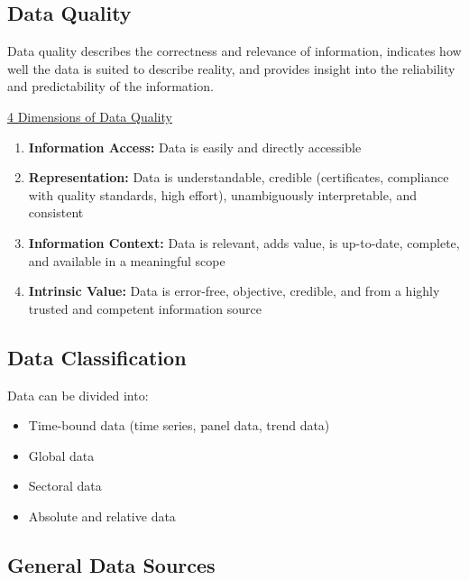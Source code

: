 \documentclass[a4paper, fleqn, headsepline, footsepline, 12pt, parskip=half]{scrartcl}
\begin{document}
\subsection{Data Quality}
\label{sec:dataQuality}

Data quality describes the correctness and relevance of information, indicates how well the data is suited to describe reality, and provides insight into the reliability and predictability of the information.

\underline{4 Dimensions of Data Quality}
    \begin{enumerate}
        \item \textbf{Information Access:} Data is easily and directly accessible   
        \item \textbf{Representation:} Data is understandable, credible (certificates, compliance with quality standards, high effort), unambiguously interpretable, and consistent
        \item \textbf{Information Context:} Data is relevant, adds value, is up-to-date, complete, and available in a meaningful scope
        \item \textbf{Intrinsic Value:} Data is error-free, objective, credible, and from a highly trusted and competent information source
    \end{enumerate}


\subsection{Data Classification}
\label{sec:dataClassification}

Data can be divided into:
\begin{itemize}
    \item Time-bound data (time series, panel data, trend data)
    \item Global data
    \item Sectoral data
    \item Absolute and relative data
\end{itemize}


\subsection{General Data Sources}
\label{sec:generalDataSources}
\end{document}

